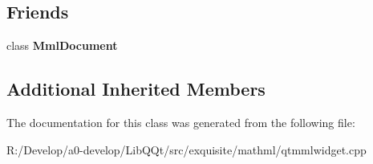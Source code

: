 \subsection*{Friends}
\begin{DoxyCompactItemize}
\item 
\mbox{\label{class_mml_node_ae305d01410355c2465efad554b59ffe5}} 
class {\bfseries Mml\+Document}
\end{DoxyCompactItemize}
\subsection*{Additional Inherited Members}


The documentation for this class was generated from the following file\+:\begin{DoxyCompactItemize}
\item 
R\+:/\+Develop/a0-\/develop/\+Lib\+Q\+Qt/src/exquisite/mathml/qtmmlwidget.\+cpp\end{DoxyCompactItemize}
